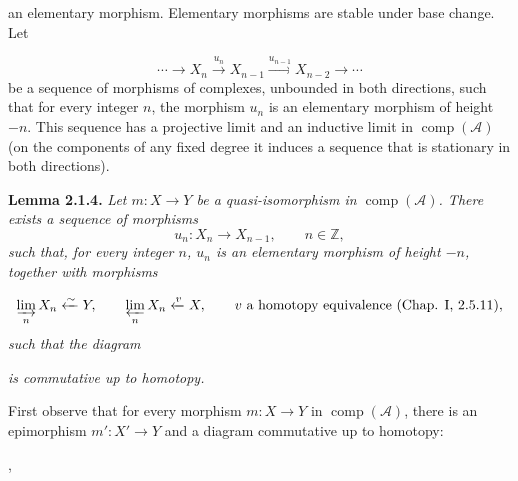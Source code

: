 \clearpage
{}%
\begingroup\small\setlength{\parskip}{0pt}\setlength{\emergencystretch}{1.5em}
\setlength{\abovedisplayskip}{4pt plus 2pt minus 2pt}%
\setlength{\belowdisplayskip}{4pt plus 2pt minus 2pt}%

an elementary morphism. Elementary morphisms are stable under base change.
Let

\[
\cdots\longrightarrow X_n\xrightarrow{u_n}X_{n-1}
\xrightarrow{u_{n-1}}X_{n-2}\longrightarrow\cdots
\]
be a sequence of morphisms of complexes, unbounded in both directions,
such that for every integer $n$, the morphism $u_n$ is an elementary
morphism of height $-n$. This sequence has a projective limit and an
inductive limit in $\operatorname{comp}(\mathcal A)$ (on the components of
any fixed degree it induces a sequence that is stationary in both
directions).

\medskip\noindent\textbf{Lemma 2.1.4.}\quad
\textit{Let $m\colon X\longrightarrow Y$ be a quasi-isomorphism in
$\operatorname{comp}(\mathcal A)$. There exists a sequence of morphisms}
\[
u_n\colon X_n\longrightarrow X_{n-1},\qquad n\in\mathbb Z,
\]
\noindent\textit{such that, for every integer $n$, $u_n$ is an elementary
morphism of height $-n$, together with morphisms}

\[
\varinjlim_n X_n\xleftarrow{\sim}Y,
\qquad
\varprojlim_n X_n\xleftarrow{v}X,
\qquad v\text{ a homotopy equivalence (Chap. I, 2.5.11)},
\]
\noindent\textit{such that the diagram}

\begin{center}
\end{center}
\noindent\textit{is commutative up to homotopy.}

First observe that for every morphism $m\colon X\longrightarrow Y$ in
$\operatorname{comp}(\mathcal A)$, there is an epimorphism
$m'\colon X'\longrightarrow Y$ and a diagram commutative up to homotopy:

\begin{center}
\qquad,
\end{center}
\endgroup
